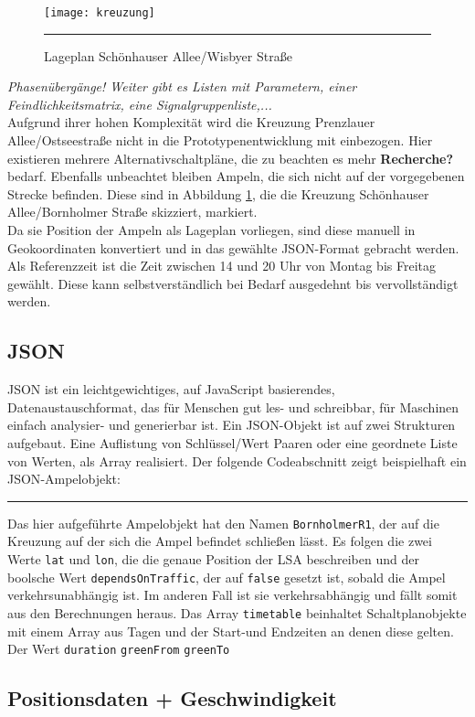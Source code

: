 \begin{figure}[H]  
    \centering  
    \texttt{[image: kreuzung]} 
    \rule{35em}{0.5pt}
    \caption{Lageplan Schönhauser Allee/Wisbyer Straße}
    \label{fig:kreuzung}
\end{figure}
\textit{Phasenübergänge! Weiter gibt es Listen mit Parametern, einer Feindlichkeitsmatrix, eine Signalgruppenliste,...}\\
Aufgrund ihrer hohen Komplexität wird die Kreuzung Prenzlauer Allee/Ostseestraße nicht in die Prototypenentwicklung mit einbezogen. Hier existieren mehrere Alternativschaltpläne, die zu beachten es mehr \textbf{Recherche?} bedarf. Ebenfalls unbeachtet bleiben Ampeln, die sich nicht auf der vorgegebenen Strecke befinden. Diese sind in Abbildung \ref{fig:kreuzung}, die die Kreuzung Schönhauser Allee/Bornholmer Straße skizziert, markiert.\\
Da sie Position der Ampeln als Lageplan vorliegen, sind diese manuell in Geokoordinaten konvertiert und in das gewählte \gls{JSON}-Format gebracht werden.
Als Referenzzeit ist die Zeit zwischen 14 und 20 Uhr von Montag bis Freitag gewählt. Diese kann selbstverständlich bei Bedarf ausgedehnt bis vervollständigt werden.
\subsection[JSON]{\gls{JSON}}
\gls{JSON} ist ein leichtgewichtiges, auf JavaScript basierendes, Datenaustauschformat, das für Menschen gut les- und schreibbar, für Maschinen einfach analysier- und generierbar ist. Ein \gls{JSON}-Objekt ist auf zwei Strukturen aufgebaut. Eine Auflistung von Schlüssel/Wert Paaren oder eine geordnete Liste von Werten, als Array realisiert. Der folgende Codeabschnitt zeigt beispielhaft ein \gls{JSON}-Ampelobjekt:  

\rule{35em}{0.5pt}
Das hier aufgeführte Ampelobjekt hat den Namen \texttt{BornholmerR1}, der auf die Kreuzung auf der sich die Ampel befindet schließen lässt. Es folgen die zwei Werte \texttt{lat} und \texttt{lon}, die die genaue Position der \gls{LSA} beschreiben und der boolsche Wert \texttt{dependsOnTraffic}, der auf \texttt{false} gesetzt ist, sobald die Ampel verkehrsunabhängig ist. Im anderen Fall ist sie verkehrsabhängig und fällt somit aus den Berechnungen heraus. Das Array \texttt{timetable} beinhaltet Schaltplanobjekte mit einem Array aus Tagen und der Start-und Endzeiten an denen diese gelten. Der Wert \texttt{duration}   \texttt{greenFrom} \texttt{greenTo}
\subsection{Positionsdaten + Geschwindigkeit}
